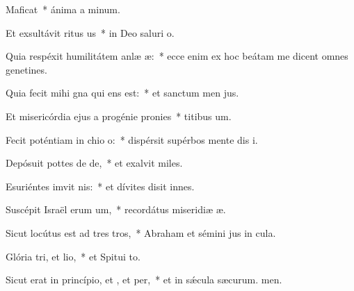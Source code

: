 \item Maficat~* ánima a minum.
\item Et exsultávit ritus us~* in Deo saluri o.
\item Quia respéxit humilitátem anlæ æ:~* ecce enim ex hoc beátam me dicent omnes genetines.
\item Quia fecit mihi gna qui ens est:~* et sanctum men jus.
\item Et misericórdia ejus a progénie  pronies~* titibus um.
\item Fecit poténtiam in chio o:~* dispérsit supérbos mente dis i.
\item Depósuit pottes de de,~* et exalvit miles.
\item Esuriéntes imvit nis:~* et dívites disit innes.
\item Suscépit Israël erum um,~* recordátus miseridiæ æ.
\item Sicut locútus est ad tres tros,~* Abraham et sémini jus in cula.
\item Glória tri, et lio,~* et Spitui to.
\item Sicut erat in princípio, et , et per,~* et in sǽcula sæcurum. men.
